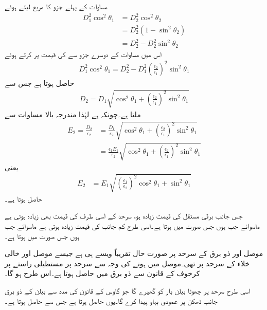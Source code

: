 مساوات  کے پہلے جزو کا مربع لیتے ہوئے
\begin{align*}
D_1^2 \cos^2 \theta_1&=D_2^2 \cos^2 \theta_2\\
&=D_2^2 (1-\sin^2 \theta_2)\\
&=D_2^2-D_2^2 \sin^2\theta_2
\end{align*}
اس میں مساوات  کے دوسرے جزو سے  کی قیمت پر کرتے ہوئے
\begin{align*}
D_1^2 \cos^2\theta_1=D_2^2-D_1^2 \left(\frac{\epsilon_2}{\epsilon_1}\right)^2\sin^2\theta_1
\end{align*}
حاصل ہوتا ہے جس سے
\begin{align}
D_2=D_1\sqrt{\cos^2\theta_1+\left(\frac{\epsilon_2}{\epsilon_1}\right)^2\sin^2\theta_1}
\end{align}
ملتا ہے۔چونکہ  ہے لہٰذا مندرجہ بالا مساوات سے
\begin{align*}
E_2=\frac{D_2}{\epsilon_2}&=\frac{D_1}{\epsilon_2}\sqrt{\cos^2\theta_1+\left(\frac{\epsilon_2}{\epsilon_1}\right)^2\sin^2\theta_1}\\
&=\frac{\epsilon_1 E_1}{\epsilon_2}\sqrt{\cos^2\theta_1+\left(\frac{\epsilon_2}{\epsilon_1}\right)^2\sin^2\theta_1}
\end{align*}
یعنی
\begin{align}
E_2&=E_1\sqrt{\left(\frac{\epsilon_1}{\epsilon_2} \right)^2\cos^2\theta_1+\sin^2\theta_1}
\end{align}
حاصل ہوتا ہے۔

جس جانب برقی مستقل کی قیمت  زیادہ ہو، سرحد کے اسی طرف  کی قیمت بھی زیادہ ہوتی ہے ماسوائے جب  ہوں جس صورت میں   ہوتا ہے۔اسی طرح کم  جانب  کی قیمت زیادہ ہوتی ہے ماسوائے جب  ہوں جس صورت میں  ہوتا ہے۔

موصل اور ذو برق کے سرحد پر صورت حال تقریباً ویسے ہی ہے جیسے موصل اور خالی خلاء کے سرحد پر تھی۔موصل میں  ہونے کی وجہ سے سرحد پر مستطیلی راستے پر کرخوف کے قانون سے ذو برق میں  حاصل ہوتا ہے۔اس طرح  ہو گا۔

اسی طرح سرحد پر چھوٹا بیلن  بار کو گھیرے گا جو گاوس کے قانون کی مدد سے بیلن کے ذو برق جانب ڈھکن پر  عمودی بہاو  پیدا کرے گا۔یوں  حاصل ہوتا ہے جس سے  حاصل ہوتا ہے۔

